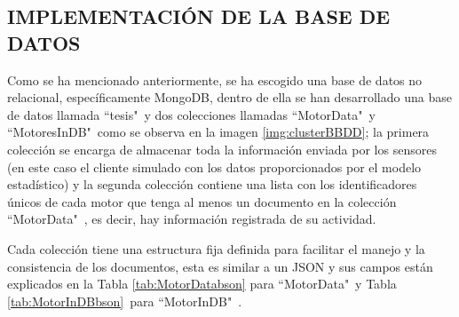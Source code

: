 

\subsection{IMPLEMENTACIÓN DE LA BASE DE DATOS}

    Como se ha mencionado anteriormente, se ha escogido una base de datos no
    relacional, específicamente MongoDB, dentro de ella se han desarrollado
    una base de datos llamada ``tesis"\   y dos colecciones llamadas ``MotorData"\  y
    ``MotoresInDB"\ como se observa en la imagen \ref{img:clusterBBDD}; la primera colección se encarga de almacenar toda la información
    enviada por los sensores (en este caso el cliente simulado con los datos
    proporcionados por el modelo estadístico) y la segunda colección contiene una
    lista con los identificadores únicos de cada motor que tenga al menos un documento
    en la colección ``MotorData"\ , es decir, hay información registrada de su actividad.

    Cada colección tiene una estructura fija definida para facilitar el manejo y
    la consistencia de los documentos, esta es similar a un JSON y sus campos
    están explicados en la Tabla \ref{tab:MotorDatabson} para ``MotorData"\  y
    Tabla
    \ref{tab:MotorInDBbson}\  para ``MotorInDB"\ .

